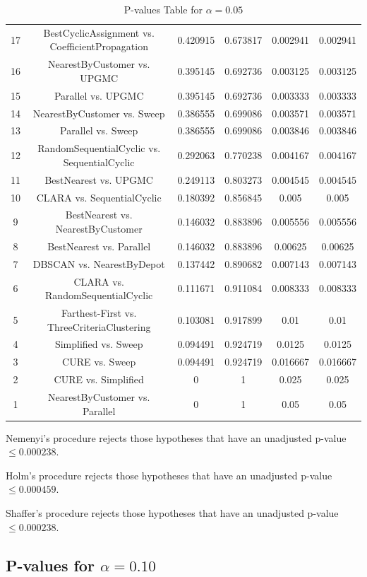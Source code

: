 \documentclass[a4paper,10pt]{article}
\begin{document}
\begin{landscape}
\begin{table}[!htp]
\begin{tabular}{cccccc}
17&BestCyclicAssignment vs. CoefficientPropagation&0.420915&0.673817&0.002941&0.002941\\
16&NearestByCustomer vs. UPGMC&0.395145&0.692736&0.003125&0.003125\\
15&Parallel vs. UPGMC&0.395145&0.692736&0.003333&0.003333\\
14&NearestByCustomer vs. Sweep&0.386555&0.699086&0.003571&0.003571\\
13&Parallel vs. Sweep&0.386555&0.699086&0.003846&0.003846\\
12&RandomSequentialCyclic vs. SequentialCyclic&0.292063&0.770238&0.004167&0.004167\\
11&BestNearest vs. UPGMC&0.249113&0.803273&0.004545&0.004545\\
10&CLARA vs. SequentialCyclic&0.180392&0.856845&0.005&0.005\\
9&BestNearest vs. NearestByCustomer&0.146032&0.883896&0.005556&0.005556\\
8&BestNearest vs. Parallel&0.146032&0.883896&0.00625&0.00625\\
7&DBSCAN vs. NearestByDepot&0.137442&0.890682&0.007143&0.007143\\
6&CLARA vs. RandomSequentialCyclic&0.111671&0.911084&0.008333&0.008333\\
5&Farthest-First vs. ThreeCriteriaClustering&0.103081&0.917899&0.01&0.01\\
4&Simplified vs. Sweep&0.094491&0.924719&0.0125&0.0125\\
3&CURE vs. Sweep&0.094491&0.924719&0.016667&0.016667\\
2&CURE vs. Simplified&0&1&0.025&0.025\\
1&NearestByCustomer vs. Parallel&0&1&0.05&0.05\\
\hline
\end{tabular}
\caption{P-values Table for $\alpha=0.05$}
\end{table}Nemenyi's procedure rejects those hypotheses that have an unadjusted p-value $\le0.000238$.

Holm's procedure rejects those hypotheses that have an unadjusted p-value $\le0.000459$.

Shaffer's procedure rejects those hypotheses that have an unadjusted p-value $\le0.000238$.

\pagebreak

\subsection{P-values for $\alpha=0.10$}


\end{landscape}
\end{document}
